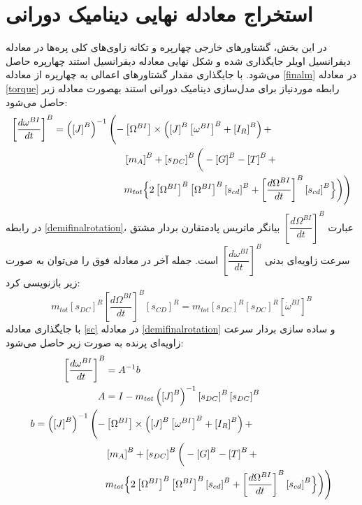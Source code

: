 \section{ استخراج معادله نهایی دينامیک دورانی}
در این بخش، گشتاورهای خارجی چهارپره و تكانه زاوی‌های کلی پره‌ها در معادله دیفرانسیل اویلر 
جایگذاری شده و شكل نهایی معادله دیفرانسیل استند چهارپره حاصل می‌شود. با جایگذاری مقدار 
گشتاورهای اعمالی به چهارپره از معادله
\ref{finalm}
در معادله 
\ref{torque}
رابطه موردنیاز برای مدل‌سازی
دینامیک دورانی استند بهصورت معادله زیر حاصل می‌شود:
\begin{equation}\label{demifinalrotation}
	\begin{split}
		\left[\dfrac{d\omega^{BI}}{dt}\right]^B = 
		\left(\left[J\right]^B\right)^{-1}\Bigg(
		-&\left[\Omega^{BI}\right]\times\left(
		\left[J\right]^B\left[\omega^{BI}\right]^B
		+\left[I_R\right]^B\right) + \\
		&\left[m_A\right]^B+\left[s_{DC}\right]^B
		\bigg(-\left[G\right]^B
		-\left[T\right]^B+ \\
		&m_{tot}\Bigl\{2
		\left[\Omega^{BI}\right]^B
		\left[\Omega^{BI}\right]^B
		\left[s_{cd}\right]^B+
		\left[\dfrac{d\Omega^{BI}}{dt}\right]^B
		\left[s_{cd}\right]^B
		\Bigr\}\bigg)\Bigg)
	\end{split}
\end{equation}
در رابطه
\ref{demifinalrotation}،
عبارت
$\left[\dfrac{d\Omega^{BI}}{dt}\right]^B$
بیانگر ماتریس پادمتقارن بردار مشتق سرعت‌ زاویه‌ای بدنی
$\left[\dfrac{d\omega^{BI}}{dt}\right]^B$
است. جمله آخر در معادله فوق را می‌توان به صورت زیر بازنویسی کرد:
\begin{equation}\label{sc}
	m_{tot}\left[s_{DC}\right]^R
	\left[\dfrac{d\Omega^{BI}}{dt}\right]^B\left[s_{CD}\right]^R = 
	m_{tot}\left[s_{DC}\right]^R\left[s_{DC}\right]^R
	\left[\dot{\omega}^{BI}\right]^B
\end{equation}
با جایگذاری معادله
\ref{sc}
در معادله
\ref{demifinalrotation}
و ساده سازی بردار سرعت زاویه‌ای پرنده به صورت زیر حاصل می‌شود:
\begin{equation}\label{finaltorquefinal}
	\begin{split}
		\left[\dfrac{d\omega^{BI}}{dt}\right]^B &= A^{-1}b\\
		A &= I - m_{tot}\left(\left[J\right]^B\right)^{-1}
		\left[s_{DC}\right]^B
		\left[s_{DC}\right]^B\\
		b = \left(\left[J\right]^B\right)^{-1}\Bigg(
		-&\left[\Omega^{BI}\right]\times\left(
		\left[J\right]^B\left[\omega^{BI}\right]^B
		+\left[I_R\right]^B\right) + \\
		&\left[m_A\right]^B+\left[s_{DC}\right]^B
		\bigg(-\left[G\right]^B
		-\left[T\right]^B+ \\
		&m_{tot}\Bigl\{2
		\left[\Omega^{BI}\right]^B
		\left[\Omega^{BI}\right]^B
		\left[s_{cd}\right]^B+
		\left[\dfrac{d\Omega^{BI}}{dt}\right]^B
		\left[s_{cd}\right]^B
		\Bigr\}\bigg)\Bigg)		
	\end{split}
\end{equation}

